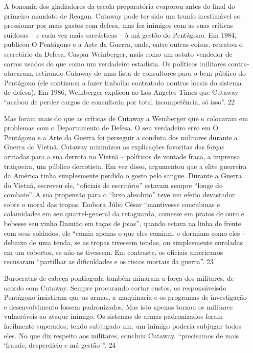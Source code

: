  
\par
 
A bonomia dos gladiadores da escola preparatória evaporou antes do final do primeiro mandato de Reagan. Cutaway pode ter sido um trunfo inestimável ao pressionar por mais gastos com defesa, mas fez inimigos com as suas críticas ruidosas – e cada vez mais sarcásticas – à má gestão do Pentágono. Em 1984, publicou O Pentágono e a Arte da Guerra, onde, entre outras coisas, retratou o secretário da Defesa, Caspar Weinberger, mais como um astuto vendedor de carros usados ​​do que como um verdadeiro estadista. Os políticos militares contra-atacaram, retirando Cutaway de uma lista de consultores para o bem público do Pentágono (ele continuou a fazer trabalho contratado noutros locais do sistema de defesa). Em 1986, Weinberger explicou ao Los Angeles Times que Cutaway “acabou de perder cargos de consultoria por total incompetência, só isso”.
 {\color{blue} 22}  

 
\par
 
Mas foram mais do que as críticas de Cutaway a Weinberger que o colocaram em problemas com o Departamento de Defesa. O seu verdadeiro erro em O Pentágono e a Arte da Guerra foi perseguir a conduta dos militares durante a Guerra do Vietnã. Cutaway minimizou as explicações favoritas das forças armadas para a sua derrota no Vietnã – políticos de vontade fraca, a imprensa traiçoeira, um público derrotista. Em vez disso, argumentou que a elite guerreira da América tinha simplesmente perdido o gosto pelo sangue. Durante a Guerra do Vietnã, escreveu ele, “oficiais de escritório” estavam sempre “longe do combate”. A sua propensão para o “luxo absoluto” teve um efeito devastador sobre o moral das tropas. Embora Júlio César “mantivesse concubinas e calamidades em seu quartel-general da retaguarda, comesse em pratos de ouro e bebesse seu vinho Damião em taças de joias”, quando estava na linha de frente com seus soldados, ele “comia apenas o que eles comiam, e dormiam como eles - debaixo de uma tenda, se as tropas tivessem tendas, ou simplesmente enroladas em um cobertor, se não as tivessem. Em contraste, os oficiais americanos recusaram “partilhar as dificuldades e os riscos mortais da guerra”.
 {\color{blue} 23}  

 
\par
 
Burocratas de cabeça pontiaguda também minaram a força dos militares, de acordo com Cutaway. Sempre procurando cortar custos, os responsáveis ​​do Pentágono insistiram que as armas, a maquinaria e os programas de investigação e desenvolvimento fossem padronizados. Mas isto apenas tornou os militares vulneráveis ​​ao ataque inimigo. Os sistemas de armas padronizados foram facilmente superados; tendo subjugado um, um inimigo poderia subjugar todos eles. No que diz respeito aos militares, concluiu Cutaway, “precisamos de mais ‘fraude, desperdício e má gestão’”.
 {\color{blue} 24}  

